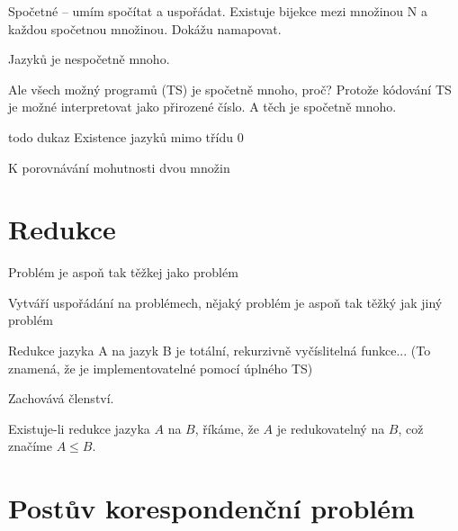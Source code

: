 Spočetné -- umím spočítat a uspořádat. Existuje bijekce mezi množinou N a každou spočetnou množinou. Dokážu namapovat.

Jazyků je nespočetně mnoho.

Ale všech možný programů (TS) je spočetně mnoho, proč? Protože kódování TS je možné interpretovat jako přirozené číslo. A těch je spočetně mnoho.


todo dukaz Existence jazyků mimo třídu 0

K porovnávání mohutnosti dvou množin


\section{Redukce}

\begin{compactitem}

    \item Problém je aspoň tak těžkej jako problém

    \item Vytváří uspořádání na problémech, nějaký problém je aspoň tak těžký jak jiný problém

    \item Redukce jazyka A na jazyk B je totální, rekurzivně vyčíslitelná funkce... (To znamená, že je implementovatelné pomocí úplného TS)

    \item Zachovává členství.

    \item Existuje-li redukce jazyka $A$ na $B$, říkáme, že $A$ je redukovatelný na $B$, což značíme $A \leq B$.

\end{compactitem}




\section{Postův korespondenční problém}

